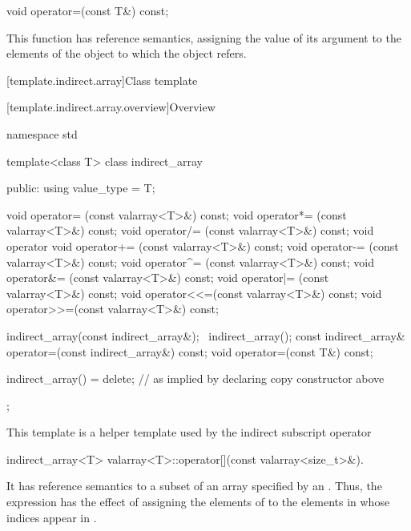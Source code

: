 %
\begin{itemdecl}
void operator=(const T&) const;
\end{itemdecl}

\begin{itemdescr}
\pnum
This function has reference semantics, assigning the value of its
argument to the elements of the
object to which the
object refers.
\end{itemdescr}

[template.indirect.array]{Class template }

[template.indirect.array.overview]{Overview}

%
%
\begin{codeblock}
namespace std {
  template<class T> class indirect_array {
  public:
    using value_type = T;

    void operator=  (const valarray<T>&) const;
    void operator*= (const valarray<T>&) const;
    void operator/= (const valarray<T>&) const;
    void operator%
    void operator+= (const valarray<T>&) const;
    void operator-= (const valarray<T>&) const;
    void operator^= (const valarray<T>&) const;
    void operator&= (const valarray<T>&) const;
    void operator|= (const valarray<T>&) const;
    void operator<<=(const valarray<T>&) const;
    void operator>>=(const valarray<T>&) const;

    indirect_array(const indirect_array&);
    ~indirect_array();
    const indirect_array& operator=(const indirect_array&) const;
    void operator=(const T&) const;

    indirect_array() = delete;        // as implied by declaring copy constructor above
  };
}
\end{codeblock}

\pnum
This template is a helper template used by the indirect subscript operator

%
\begin{itemdecl}
indirect_array<T> valarray<T>::operator[](const valarray<size_t>&).
\end{itemdecl}

\pnum
It has reference semantics to a subset of an array specified by an
.
Thus, the expression
has the effect of assigning the elements of
to the elements in
whose indices appear in
.

